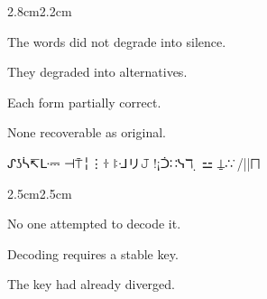 \begin{center}
\end{center}

\vspace{1em}

\begin{center}
\end{center}

\vspace{1em}

\begin{center}
\end{center}

\vspace{3em}

\begin{adjustwidth}{2.8cm}{2.2cm}

The words did not degrade into silence.

\medskip

They degraded into alternatives.

\medskip

Each form partially correct.

\medskip

None recoverable as original.

\vspace{3em}

\end{adjustwidth}

\begin{center}
{\Large ᔑʖᓵ↸ᒷ⎓ ⊣⍑╎⋮ꖌ ꖎᒲリ𝙹 !¡ᑑ∷ᓭℸ ̣ ⚍ ⍊∴ ̇/||⨅}
\end{center}

\vspace{1em}

\begin{center}
{\small {}}
\end{center}

\vspace{3em}

\begin{adjustwidth}{2.5cm}{2.5cm}

No one attempted to decode it.

\medskip

Decoding requires a stable key.

\medskip

The key had already diverged.

\vspace{3em}

\end{adjustwidth}

